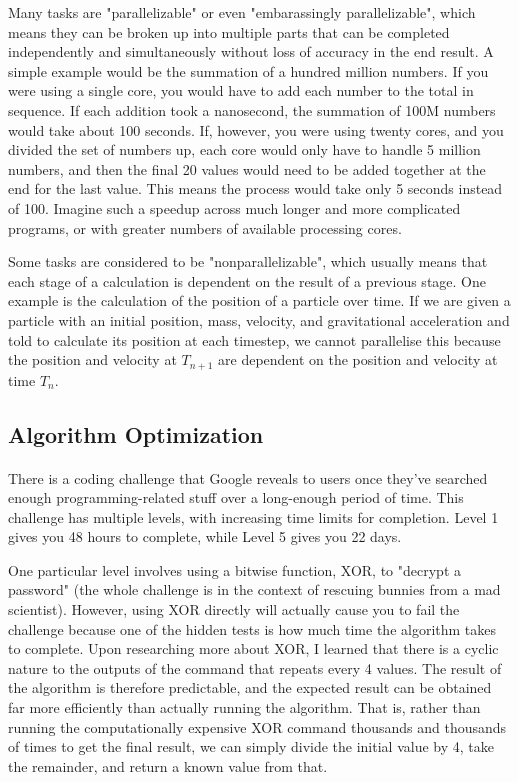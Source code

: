 Many tasks are "parallelizable" or even "embarassingly parallelizable", which means they can be broken up into multiple parts that can be completed independently and simultaneously without loss of accuracy in the end result.
A simple example would be the summation of a hundred million numbers.
If you were using a single core, you would have to add each number to the total in sequence.
If each addition took a nanosecond, the summation of 100M numbers would take about 100 seconds.
If, however, you were using twenty cores, and you divided the set of numbers up, each core would only have to handle 5 million numbers, and then the final 20 values would need to be added together at the end for the last value.  
This means the process would take only 5 seconds instead of 100.  
Imagine such a speedup across much longer and more complicated programs, or with greater numbers of available processing cores.

Some tasks are considered to be "nonparallelizable", which usually means that each stage of a calculation is dependent on the result of a previous stage.  
One example is the calculation of the position of a particle over time.
If we are given a particle with an initial position, mass, velocity, and gravitational acceleration and told to calculate its position at each timestep, we cannot parallelise this because the position and velocity at $T_{n+1}$ are dependent on the position and velocity at time $T_{n}$.

\subsection*{Algorithm Optimization}
\paragraph{} There is a coding challenge that Google reveals to users once they've searched enough programming-related stuff over a long-enough period of time.
This challenge has multiple levels, with increasing time limits for completion.
Level 1 gives you 48 hours to complete, while Level 5 gives you 22 days.

One particular level involves using a bitwise function, XOR, to "decrypt a password" (the whole challenge is in the context of rescuing bunnies from a mad scientist).
However, using XOR directly will actually cause you to fail the challenge because one of the hidden tests is how much time the algorithm takes to complete.
Upon researching more about XOR, I learned that there is a cyclic nature to the outputs of the command that repeats every 4 values.
The result of the algorithm is therefore predictable, and the expected result can be obtained far more efficiently than actually running the algorithm.
That is, rather than running the computationally expensive XOR command thousands and thousands of times to get the final result, we can simply divide the initial value by 4, take the remainder, and return a known value from that.

